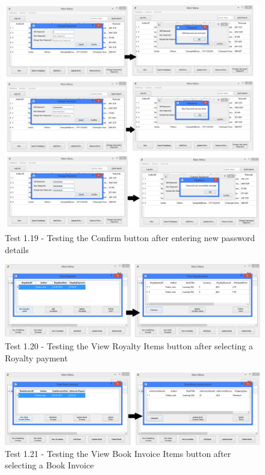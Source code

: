\begin{landscape}
\begin{figure}[H]
    \includegraphics[width=\textwidth]{./Testing/Evidence/ConfirmPasswordButtonTest.png}
    \caption{Test 1.19 - Testing the Confirm button after entering new password details}  \label{fig:ConfirmPasswordButtonTest}
\end{figure}

\begin{figure}[H]
    \includegraphics[width=\textwidth]{./Testing/Evidence/ViewRoyaltyItemsButtonTest.png}
    \caption{Test 1.20 - Testing the View Royalty Items button after selecting a Royalty payment}  \label{fig:ViewRoyaltyItemsButtonTest}
\end{figure}

\begin{figure}[H]
    \includegraphics[width=\textwidth]{./Testing/Evidence/ViewBookInvoiceItemsButtonTest.png}
    \caption{Test 1.21 - Testing the View Book Invoice Items button after selecting a Book Invoice}  \label{fig:ViewBookInvoiceItemsButtonTest}
\end{figure}


\end{landscape}
